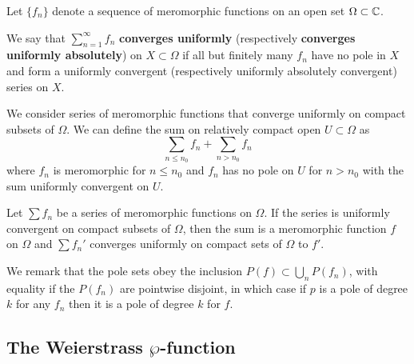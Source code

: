 \documentclass{article}
\begin{document}
Let \(\{f_n\}\) denote a sequence of meromorphic functions on an open set \(\Omega \subset \mathbb{C}\).
\begin{definition}
We say that \(\sum_{n = 1}^\infty f_n\) \textbf{converges uniformly} (respectively \textbf{converges uniformly absolutely}) on \(X \subset \Omega\) if all but finitely many \(f_n\) have no pole in \(X\) and form a uniformly convergent (respectively uniformly absolutely convergent) series on \(X\).
\end{definition}
We consider series of meromorphic functions that converge uniformly on compact subsets of \(\Omega\). We can define the sum on relatively compact open \(U \subset \Omega\) as
\begin{equation}\sum_{n \leq n_0}f_n + \sum_{n > n_0}f_n\end{equation}
where \(f_n\) is meromorphic for \(n \leq n_0\) and \(f_n\) has no pole on \(U\) for \(n > n_0\) with the sum uniformly convergent on \(U\).
\begin{theorem}
Let \(\sum f_n\) be a series of meromorphic functions on \(\Omega\). If the series is uniformly convergent on compact subsets of \(\Omega\), then the sum is a meromorphic function \(f\) on \(\Omega\) and \(\sum f_n'\) converges uniformly on compact sets of \(\Omega\) to \(f'\).
\end{theorem}
We remark that the pole sets obey the inclusion \(P(f) \subset \bigcup_nP(f_n)\), with equality if the \(P(f_n)\) are pointwise disjoint, in which case if \(p\) is a pole of degree \(k\) for any \(f_n\) then it is a pole of degree \(k\) for \(f\).


\subsection{The Weierstrass \(\wp\)-function}
\end{document}

